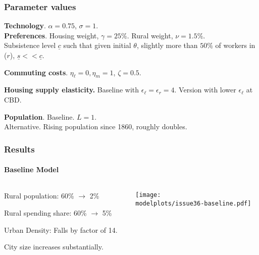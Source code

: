 \documentclass[aspectratio=169]{beamer}
\begin{document}
\begin{frame}
\frametitle{Parameter values}

\noindent \textbf{Technology}. $\alpha=0.75$, $\sigma=1$.\\
\medskip
\noindent \textbf{Preferences}. Housing weight, $\gamma=25\%$. Rural weight, $\nu=1.5\%$.\\
Subsistence level $\underline{c}$ such that given initial $\theta$, slightly more than $50\%$ of workers in ($r$), $\underline{s} << \underline{c}$.

\medskip
\noindent \textbf{Commuting costs}. $\eta_\ell=0, \eta_m=1$, $\zeta = 0.5$.

\medskip
\noindent \textbf{Housing supply elasticity.} Baseline with $\epsilon_{\ell} = \epsilon_r=4$. Version with lower $\epsilon_{\ell}$ at CBD.

\medskip
\noindent \textbf{Population}. Baseline. $L=1$.\\
Alternative. Rising population since 1860, roughly doubles.
\end{frame}

\begin{frame}[label=res_laborland]
\frametitle{Results}
\framesubtitle{Baseline Model}

\begin{columns}
\begin{column}{0.3\textwidth}
\begin{mide}
\item Rural population: 60\% $\rightarrow$ 2\%
\item Rural spending share: 60\% $\rightarrow$ 5\%
\item Urban Density: Falls by factor of 14.
\item City size increases substantially.
\end{mide}
\end{column}
\begin{column}{0.7\textwidth}
\begin{adjustbox}{center}
\texttt{[image: \\modelplots/issue36-baseline.pdf]}\end{adjustbox}
\end{column}\end{columns}
\end{frame}
\end{document}
